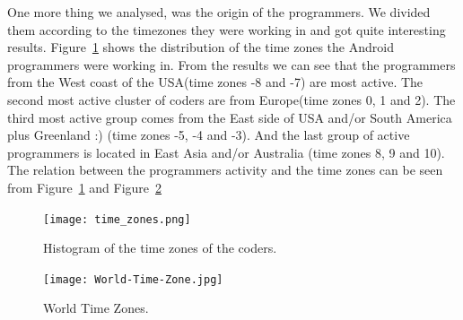 \documentclass[a4paper,11pt]{report}
\begin{document}
One more thing we analysed, was the origin of the programmers. We divided them according to the timezones they were working in and got quite interesting results. Figure~\ref{fig:time_zones} shows the distribution of the time zones the Android programmers were working in. From the results we can see that the programmers from the West coast of the USA(time zones -8 and -7) are most active. The second most active cluster of coders are from Europe(time zones 0, 1 and 2). The third most active group comes from the East side of USA and/or South America plus Greenland :) (time zones -5, -4 and -3). And the last group of active programmers is located in East Asia and/or Australia (time zones 8, 9 and 10). The relation between the programmers activity and the time zones can be seen from Figure~\ref{fig:time_zones} and Figure~\ref{fig:tz_map}

\begin{figure}[ht!]
\centering
\texttt{[image: time\_zones.png]}
\caption{Histogram of the time zones of the coders.}
\label{fig:time_zones}
\end{figure}

\begin{figure}[ht!]
\centering
\texttt{[image: World-Time-Zone.jpg]}
\caption{World Time Zones.}
\label{fig:tz_map}
\end{figure}

\end{document}
